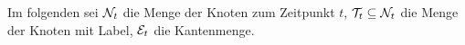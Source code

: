 Im folgenden sei $\mathcal{N}_t$ die Menge der Knoten zum Zeitpunkt
$t$, $\mathcal{T}_t \subseteq \mathcal{N}_t$ die Menge der Knoten
mit Label, $\mathcal{E}_t$ die Kantenmenge.
